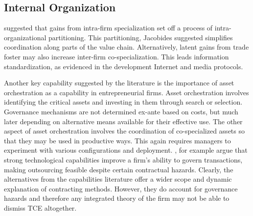 \documentclass[12pt,letterpaper]{article}
\begin{document}
\subsection{Internal Organization}
\cite{Jacobides2005b} suggested that gains from intra-firm specialization set off a process of intra-organizational partitioning. This partitioning, Jacobides suggested simplifies coordination along parts of the value chain. Alternatively, latent gains from trade foster may also increase inter-firm co-specialization. This leads information standardization, as evidenced in the development Internet and media protocols. \par
Another key capability suggested by the literature is the importance of asset orchestration as a capability in entrepreneurial firms. Asset orchestration involves identifying the critical assets and investing in them through search or selection. Governance mechanisms are not determined ex-ante based on costs, but much later depending on alternative means available for their effective use. The other aspect of asset orchestration involves the coordination of co-specialized assets so that they may be used in productive ways. This again requires managers to experiment with various configurations and deployment. \cite{Mayer2006}, for example argue that strong technological capabilities improve a firm's ability to govern transactions, making outsourcing feasible despite certain contractual hazards. Clearly, the alternatives from the capabilities literature offer a wider scope and dynamic explanation of contracting methods. However, they do account for governance hazards and therefore any integrated theory of the firm may not be able to dismiss TCE altogether.
\end{document}
